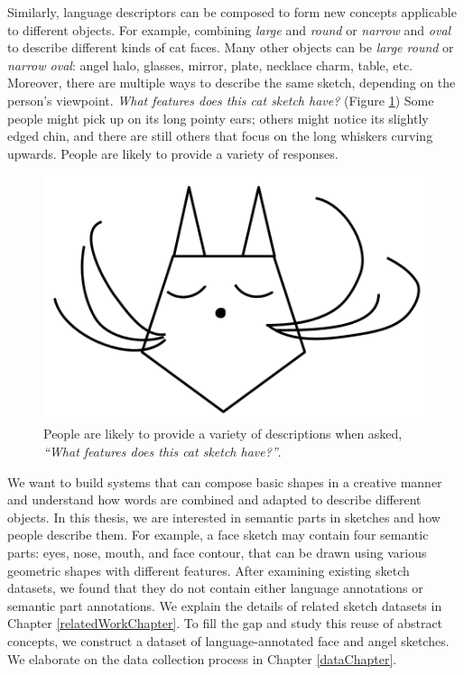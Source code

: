 Similarly, language descriptors can be composed to form new concepts applicable to different objects. For example, combining \textit{large} and \textit{round} or \textit{narrow} and \textit{oval} to describe different kinds of cat faces.
Many other objects can be \textit{large round} or \textit{narrow oval}: angel halo, glasses, mirror, plate, necklace charm, table, etc.
Moreover, there are multiple ways to describe the same sketch, depending on the person's viewpoint. \textit{What features does this cat sketch have?} (Figure \ref{introduction.cat.face}) Some people might pick up on its long pointy ears; others might notice its slightly edged chin, and there are still others that focus on the long whiskers curving upwards. People are likely to provide a variety of responses.  
\begin{figure}[!h]
\centering
\includegraphics[width=.3\linewidth]{introduction/catFace.png}  
\caption{People are likely to provide a variety of descriptions when asked, \textit{``What features does this cat sketch have?''}.}
\label{introduction.cat.face}
\end{figure}



We want to build systems that can compose basic shapes in a creative manner and understand how words are combined and adapted to describe different objects.  
In this thesis, we are interested in semantic parts in sketches and how people describe them. For example, a face sketch may contain four semantic parts: eyes, nose, mouth, and face contour, that can be drawn using various geometric shapes with different features. After examining existing sketch datasets, we found that they do not contain either language annotations or semantic part annotations. We explain the details of related sketch datasets in Chapter \ref{relatedWorkChapter}. To fill the gap and study this reuse of abstract concepts, we construct a dataset of language-annotated face and angel sketches. We elaborate on the data collection process in Chapter \ref{dataChapter}.  


